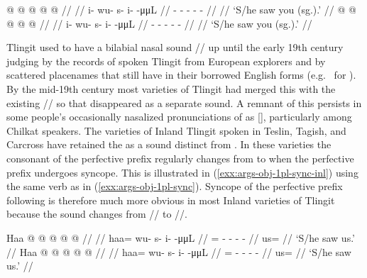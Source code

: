 \pex\label{exx:args-obj-1pl-sync-2sg}%
\a\label{ex:args-obj-1pl-sync-2sg-without}%
%
\ljudge{*}%
\begingl
	\gla	{} @ {} @ {} @ {} @ {} @ {} //
	\glp	\llap{[}\rlap{\ipa{ʔì.\gm{wù}.sì.ˈtʰìːn}]} {} {} {} {} {} //
	\glb	i- wu- s- i-  -μμL //
	\glc	{}- - - -  - //
	\gld	{} {} {} {} {} {} //
	\glft	‘S/he saw you (sg.).’
		//
\endgl
\a\label{ex:args-obj-1pl-sync-2sg-with}%
%
\begingl
	\gla	{} @ {} @ {} @ {} @ {} @ {} //
	\glp	\llap{[}\rlap{\ipa{ʔì\gm{w}.sì.ˈtʰìːn}]} {} {} {} {} {} //
	\glb	i- wu- s- i-  -μμL //
	\glc	{}- - - -  - //
	\gld	{} {} {} {} {} {} //
	\glft	‘S/he saw you (sg.).’
		//
\endgl
\xe

Tlingit used to have a bilabial nasal sound  // up until the early 19th century judging by the records of spoken Tlingit from European explorers and by scattered placenames that still have  in their borrowed English forms (e.g.\  for ).
By the mid-19th century most varieties of Tlingit had merged this with the existing  // so that  disappeared as a separate sound.
A remnant of this  persists in some people’s occasionally nasalized pronunciations of  as [], particularly among Chilkat speakers.
The varieties of Inland Tlingit spoken in Teslin, Tagish, and Carcross have retained the  as a sound distinct from .
In these varieties the consonant of the perfective prefix regularly changes from  to  when the perfective prefix undergoes syncope.
This is illustrated in (\ref{exx:args-obj-1pl-sync-inl}) using the same verb as in (\ref{exx:args-obj-1pl-sync}).
Syncope of the perfective prefix following  is therefore much more obvious in most Inland varieties of Tlingit because the sound changes from // to //.

\pex\label{exx:args-obj-1pl-sync-inl}%
\a\label{ex:args-obj-1pl-sync-inl-without}%
%
\begingl
	\gla	Haa @  @ {} @ {} @ {} @ {} //
	\glp	\llap{[}\rlap{\ipa{hàː.\gm{wù}.sì.ˈtʰìːn}]} {} {} {} {} {} //
	\glb	haa= wu- s- i-  -μμL //
	\glc	{}= - - -  - //
	\gld	us=  {} {} {} {} //
	\glft	‘S/he saw us.’
		//
\endgl
\a\label{ex:args-obj-1pl-sync-inl-with}%
%
\begingl
	\gla	Haa @  @ {} @ {} @ {} @ {} //
	\glp	\llap{[}\rlap{\ipa{hàː\gm{m}.sì.ˈtʰìːn}]} {} {} {} {} {} //
	\glb	haa= wu- s- i-  -μμL //
	\glc	{}= - - -  - //
	\gld	us=  {} {} {} {} //
	\glft	‘S/he saw us.’
		//
\endgl
\xe

